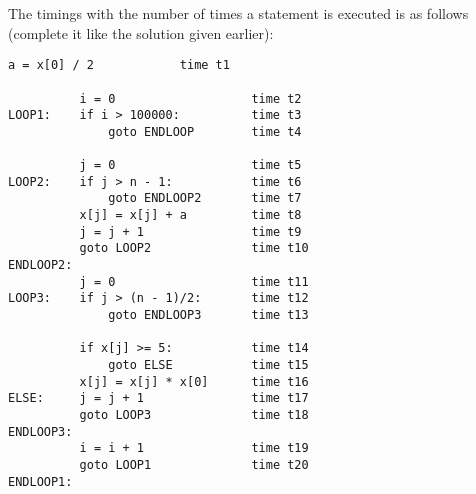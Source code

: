 
The timings with the number of times a statement is executed
is as follows (complete it like the solution given earlier):
\begin{Verbatim}[frame=single]
          a = x[0] / 2            time t1

          i = 0                   time t2           
LOOP1:    if i > 100000:          time t3
              goto ENDLOOP        time t4

          j = 0                   time t5
LOOP2:    if j > n - 1:           time t6
              goto ENDLOOP2       time t7
          x[j] = x[j] + a         time t8
          j = j + 1               time t9
          goto LOOP2              time t10
ENDLOOP2:
          j = 0                   time t11
LOOP3:    if j > (n - 1)/2:       time t12
              goto ENDLOOP3       time t13

          if x[j] >= 5:           time t14
              goto ELSE           time t15
          x[j] = x[j] * x[0]      time t16
ELSE:     j = j + 1               time t17
          goto LOOP3              time t18
ENDLOOP3:
          i = i + 1               time t19
          goto LOOP1              time t20
ENDLOOP1:
\end{Verbatim}

